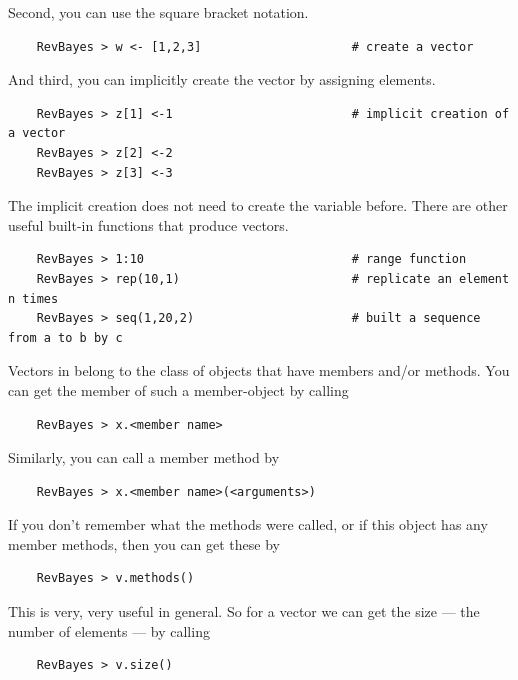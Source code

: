 \documentclass[11pt]{article}
\begin{document}
Second, you can use the square bracket notation.
{\tt \begin{snugshade*}
\begin{lstlisting}    
    RevBayes > w <- [1,2,3]                     # create a vector
\end{lstlisting}
\end{snugshade*}}
And third, you can implicitly create the vector by assigning elements.
{\tt \begin{snugshade*}
\begin{lstlisting}    
    RevBayes > z[1] <-1                         # implicit creation of a vector
    RevBayes > z[2] <-2                   
    RevBayes > z[3] <-3                  
\end{lstlisting}
\end{snugshade*}} 
The implicit creation does not need to create the variable before.
There are other useful built-in functions that produce vectors.
{\tt \begin{snugshade*}
\begin{lstlisting}    
    RevBayes > 1:10                             # range function
    RevBayes > rep(10,1)                        # replicate an element n times
    RevBayes > seq(1,20,2)                      # built a sequence from a to b by c
\end{lstlisting}
\end{snugshade*}} 

Vectors in \Rev belong to the class of objects that have members and/or methods.
You can get the member of such a member-object by calling
{\tt \begin{snugshade*}
\begin{lstlisting}    
    RevBayes > x.<member name>
\end{lstlisting}
\end{snugshade*}} 
Similarly, you can call a member method by
{\tt \begin{snugshade*}
\begin{lstlisting}    
    RevBayes > x.<member name>(<arguments>)                 
\end{lstlisting}
\end{snugshade*}} 
If you don't remember what the methods were called, or if this object has any member methods, then you can get these by
{\tt \begin{snugshade*}
\begin{lstlisting}    
    RevBayes > v.methods()                 
\end{lstlisting}
\end{snugshade*}} 
This is very, very useful in general.
So for a vector we can get the size --- the number of elements --- by calling
{\tt \begin{snugshade*}
\begin{lstlisting}    
    RevBayes > v.size()                 
\end{lstlisting}
\end{snugshade*}} 
\end{document}
